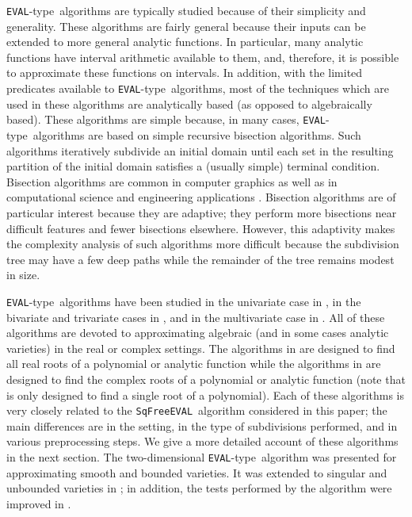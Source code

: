 \documentclass{amsart}
\theoremstyle{definition}
\newcommand{\EVAL}{\texttt{SqFreeEVAL}}
\newcommand{\EVALTYPE}{\texttt{EVAL}-type}
\begin{document}
\EVALTYPE\ algorithms are typically studied because of their simplicity and generality.  These algorithms are fairly general because their inputs can be extended to more general analytic functions.  In particular, many analytic functions have interval arithmetic available to them, and, therefore, it is possible to approximate these functions on intervals.  In addition, with the limited predicates available to \EVALTYPE\ algorithms, most of the techniques which are used in these algorithms are analytically based (as opposed to algebraically based).  These algorithms are simple because, in many cases, \EVALTYPE\ algorithms are based on simple recursive bisection algorithms.  Such algorithms iteratively subdivide an initial domain until each set in the resulting partition of the initial domain satisfies a (usually simple) terminal condition.  Bisection algorithms are common in computer graphics \citep{SurveySubdivision} as well as in computational science and engineering applications \citep{domaindecomposition}.  Bisection algorithms are of particular interest because they are adaptive; they perform more bisections near difficult features and fewer bisections elsewhere.  However, this adaptivity makes the complexity analysis of such algorithms more difficult because the subdivision tree may have a few deep paths while the remainder of the tree remains modest in size.

\EVALTYPE\ algorithms have been studied in the univariate case in \citep{Henrici:search:70,Yakoubsohn:bisection:05,sagraloff-yap:ceval:09,burr-sharma-yap:eval:09,Burr-Krahmer-Yap:integral:09}, in the bivariate and trivariate cases in \citep{marchingcube1987,snyder:interval:92,plantinga-vegter:isotopic:04,plantinga:thesis:06,linyap2009,burr+3:subdiv2:10}, and in the multivariate case in \citep{galehouse:thesis}.  All of these algorithms are devoted to approximating algebraic (and in some cases analytic varieties) in the real or complex settings.  The algorithms in \citep{burr-sharma-yap:eval:09,Burr-Krahmer-Yap:integral:09} are designed to find all real roots of a polynomial or analytic function while the algorithms in \citep{Henrici:search:70,Yakoubsohn:bisection:05,sagraloff-yap:ceval:09} are designed to find the complex roots of a polynomial or analytic function (note that \citep{Henrici:search:70} is only designed to find a single root of a polynomial).  Each of these algorithms is very closely related to the \EVAL\ algorithm considered in this paper; the main differences are in the setting, in the type of subdivisions performed, and in various preprocessing steps.  We give a more detailed account of these algorithms in the next section.  The two-dimensional \EVALTYPE\ algorithm \citep{plantinga-vegter:isotopic:04,plantinga:thesis:06} was presented for approximating smooth and bounded varieties.  It was extended to singular and unbounded varieties in \citep{burr+3:subdiv2:10}; in addition, the tests performed by the algorithm were improved in \citep{linyap2009}.
\end{document}
